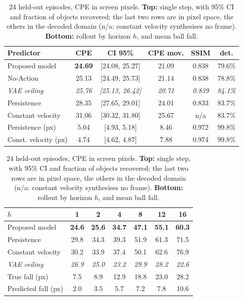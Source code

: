 \documentclass[conference]{IEEEtran}
\begin{document}
\begin{table}[!t]
\caption{24 held-out episodes, CPE in screen pixels. \textbf{Top:} single step, with 95\% CI and fraction of objects recovered; the last two rows are in pixel space, the others in the decoded domain (n/a: constant velocity synthesises no frame). \textbf{Bottom:} rollout by horizon $h$, and mean ball fall.}
\label{tab:one_step}
\centering
\tiny
\begin{tabular}{lccccc}
\hline
\textbf{Predictor} & \textbf{CPE} & \textbf{CI 95\%} & \textbf{CPE mov.} & \textbf{SSIM} & \textbf{det.} \\
\hline
Proposed model      & \textbf{24.69} & [24.08, 25.27] & 21.09 & 0.838 & 79.6\% \\
No-Action           & 25.13 & [24.49, 25.73] & 21.14 & 0.838 & 78.8\% \\
\textit{VAE ceiling}& \textit{25.76} & \textit{[25.13, 26.42]} & \textit{20.71} & \textit{0.839} & \textit{84.1\%} \\
Persistence         & 28.35 & [27.65, 29.01] & 24.01 & 0.833 & 83.7\% \\
Constant velocity   & 31.06 & [30.32, 31.80] & 25.67 & n/a & 83.7\% \\
\hline
Persistence (px)    & 5.04 & [4.93, 5.18] & 8.46 & 0.972 & 99.8\% \\
Const. velocity (px)& 4.74 & [4.62, 4.87] & 7.88 & 0.974 & 99.8\% \\
\hline
\end{tabular}

\vspace{3pt}

\begin{tabular}{lcccccc}
\hline
$h$ & 1 & 2 & 4 & 8 & 12 & 16 \\
\hline
Proposed model      & \textbf{24.6} & \textbf{25.6} & \textbf{34.7} & \textbf{47.1} & \textbf{55.1} & \textbf{60.3} \\
Persistence         & 29.8 & 34.3 & 39.3 & 51.9 & 61.3 & 71.5 \\
Constant velocity   & 30.2 & 33.9 & 37.4 & 50.1 & 62.6 & 76.9 \\
\textit{VAE ceiling}& \textit{26.9} & \textit{25.0} & \textit{23.2} & \textit{29.9} & \textit{28.2} & \textit{22.6} \\
\hline
True fall (px)      & 7.5 & 8.9 & 12.9 & 18.8 & 23.0 & 28.2 \\
Predicted fall (px) & 2.0 & 3.5 & 5.7 & 7.2 & 7.8 & 10.6 \\
\hline
\end{tabular}
\end{table}
\end{document}
